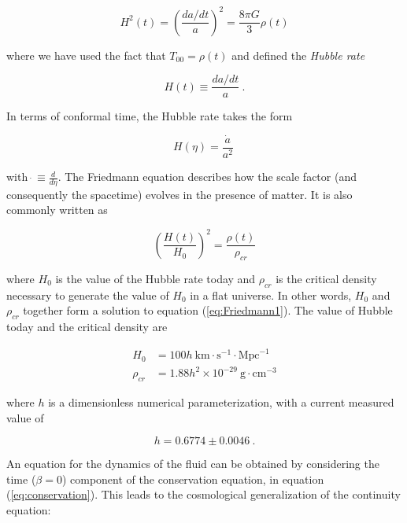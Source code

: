 \documentclass[10pt,letterpaper,final]{iopart}
\numberwithin{equation}{subsection}
\def\ni{\noindent}
\begin{document}
\begin{equation}\label{eq:Friedmann1}
H^2(t) = \left(\frac{da/dt}{a}\right)^2 = \frac{8\pi G}{3} \rho(t)
\end{equation}

\ni where we have used the fact that $T_{00} = \rho(t)$ and defined the \emph{Hubble rate}

\begin{equation}\label{eq:Hubble}
H(t) \equiv \frac{da/dt}{a} \ .
\end{equation}

\ni In terms of conformal time, the Hubble rate takes the form 

\begin{equation}\label{eq:Hubble_conformal}
H(\eta) = \frac{\dot{a}}{a^2} \ 
\end{equation}

\ni with $\dot \ \equiv \frac{d}{d\eta}$. The Friedmann equation describes how the scale factor (and consequently the spacetime) evolves in the presence of matter. It is also commonly written as

\begin{equation}\label{eq:Friedmann2}
\left(\frac{ H(t)}{H_0}\right)^2 = \frac{\rho(t)}{\rho_{cr}}
\end{equation}

\ni where $H_0$ is the value of the Hubble rate today and $\rho_{cr}$ is the critical density necessary to generate the value of $H_0$ in a flat universe. In other words, $H_0$ and $\rho_{cr}$ together form a solution to equation (\ref{eq:Friedmann1}). The value of Hubble today and the critical density are \cite{Schneider}\cite{Dodelson}\cite{Baumann}

\begin{align}
\label{eq:H0} H_0 &= 100h \ \text{km} \cdot \text{s}^{-1} \cdot \text{Mpc}^{-1} \\
\label{eq:rhocr} \rho_{cr} &= 1.88h^2 \times 10^{-29} \ \text{g} \cdot \text{cm}^{-3}
\end{align}

\ni where $h$ is a dimensionless numerical parameterization, with a current measured value \cite{Planck1} of

\begin{equation}\label{eq:h}
h = 0.6774 \pm 0.0046 \ .
\end{equation}

\ni An equation for the dynamics of the fluid can be obtained by considering the time ($\beta = 0$) component of the conservation equation, in equation (\ref{eq:conservation}). This leads to the cosmological generalization of the continuity equation:
\end{document}
